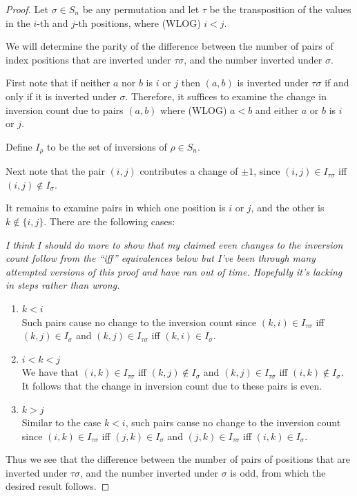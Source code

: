 \begin{proof}
  Let $\sigma \in S_n$ be any permutation and let $\tau$ be the transposition of the values in the
  $i$-th and $j$-th positions, where (WLOG) $i < j$.

  We will determine the parity of the difference between the number of pairs of index positions
  that are inverted under $\tau\sigma$, and the number inverted under $\sigma$.

  First note that if neither $a$ nor $b$ is $i$ or $j$ then $(a, b)$ is inverted under $\tau\sigma$ if and
  only if it is inverted under $\sigma$. Therefore, it suffices to examine the change in inversion count
  due to pairs $(a, b)$ where (WLOG) $a < b$ and either $a$ or $b$ is $i$ or $j$.

  Define $I_\rho$ to be the set of inversions of $\rho \in S_n$.

  Next note that the pair $(i, j)$ contributes a change of $\pm 1$, since
  $(i, j) \in I_{\tau\sigma}$ iff $(i, j) \notin I_\sigma$.

  It remains to examine pairs in which one position is $i$ or $j$, and the other is
  $k \notin \{i, j\}$. There are the following cases:

  {\it I think I should do more to show that my claimed even changes to the inversion count follow
    from the ``iff​'' equivalences below but I've been through many attempted versions of this proof
    and have ran out of time. Hopefully it's lacking in steps rather than wrong.}

  \begin{enumerate}
  \item $k < i$\\
    Such pairs cause no change to the inversion count since $(k, i) \in I_{\tau\sigma}$ iff
    $(k, j) \in I_{\sigma}$ and $(k, j) \in I_{\tau\sigma}$ iff $(k, i) \in I_{\sigma}$.
  \item $i < k < j$\\
    We have that $(i, k) \in I_{\tau\sigma}$ iff $(k, j) \notin I_\sigma$ and
    $(k, j) \in I_{\tau\sigma}$ iff $(i, k) \notin I_\sigma$. It follows that the change in inversion count due to
    these pairs is even.
  \item $k > j$\\
    Similar to the case $k < i$, such pairs cause no change to the inversion count
    since $(i, k) \in I_{\tau\sigma}$ iff $(j, k) \in I_{\sigma}$ and $(j, k) \in I_{\tau\sigma}$ iff $(i, k) \in I_{\sigma}$.
  \end{enumerate}

  Thus we see that the difference between the number of pairs of positions that are inverted
  under $\tau\sigma$, and the number inverted under $\sigma$ is odd, from which the desired result follows.
\end{proof}


